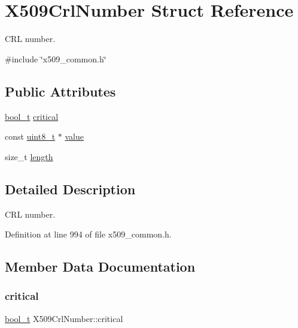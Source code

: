 \hypertarget{structX509CrlNumber}{}\section{X509\+Crl\+Number Struct Reference}
\label{structX509CrlNumber}


C\+RL number.  




{\ttfamily \#include \char`\"{}x509\+\_\+common.\+h\char`\"{}}

\subsection*{Public Attributes}
\begin{DoxyCompactItemize}
\item 
\hyperlink{compiler__port_8h_a812d16e5494522586b3784e55d479912}{bool\+\_\+t} \hyperlink{structX509CrlNumber_a27040e3f05b9880dd292216df79db133}{critical}
\item 
const \hyperlink{stdint_8h_aba7bc1797add20fe3efdf37ced1182c5}{uint8\+\_\+t} $\ast$ \hyperlink{structX509CrlNumber_a2bdf0fce19a08b65b89b12adb43e4d96}{value}
\item 
size\+\_\+t \hyperlink{structX509CrlNumber_a356c19fbf1a7212c3981b771f1288214}{length}
\end{DoxyCompactItemize}


\subsection{Detailed Description}
C\+RL number. 

Definition at line 994 of file x509\+\_\+common.\+h.



\subsection{Member Data Documentation}
\mbox{\label{structX509CrlNumber_a27040e3f05b9880dd292216df79db133}} 
\subsubsection{\texorpdfstring{critical}{critical}}
{\footnotesize\ttfamily \hyperlink{compiler__port_8h_a812d16e5494522586b3784e55d479912}{bool\+\_\+t} X509\+Crl\+Number\+::critical}



